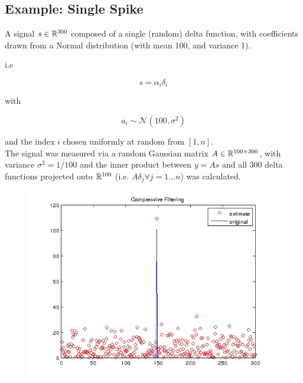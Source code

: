 \documentclass{article}
\begin{document}
\subsection{Example: Single Spike}

A signal \(s \in {\mathbb{R}}^{300}\) composed of a single (random) delta function, with coefficients drawn from a Normal distribution (with mean 100, and variance 1).

i.e 

\begin{equation}
s = \alpha_i \delta_i
\end{equation}

with 

\begin{equation}
a_i \sim \mathcal{N}\left(100, \sigma^2\right)
\end{equation}

and the index \(i\) chosen uniformly at random from \([1, n]\).
\\
The signal was measured via a random Gaussian matrix \(A \in {\mathbb{R}}^{100 \times 300}\), with variance \(\sigma^2 = 1/
100 \) and the inner product between \(y = As\) and all 300 delta functions projected onto \({\mathbb{R}}^{100}\) (i.e. \(A\delta_j \forall j=1\ldots n\)) was calculated. 

\begin{figure}[h]
\centering
\includegraphics[height = 7.3 cm]{1spike_legend.jpg}
\caption{}
\label{fig:new_basis_25}
\end{figure}


\end{document}
